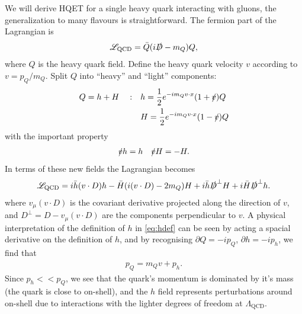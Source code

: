 We will derive HQET for a single heavy quark interacting with gluons, the generalization to many flavours is straightforward. The fermion part of the Lagrangian is
\begin{align}
  \mathscr{L}_{\text{QCD}} = \bar{Q} ( i\slashed{D} - m_Q ) Q,
  \label{eq:dirac}
\end{align}
where $Q$ is the heavy quark field. Define the heavy quark velocity $v$ according to $v = p_Q/m_Q$. Split $Q$ into ``heavy'' and ``light'' components:
\begin{align}
  \label{eq:hdef}
  Q = h + H\quad : \quad &h = {1\over 2} e^{-im_Q v\cdot x} ( 1 + \slashed{v} ) Q \\
  &H = {1\over 2} e^{-im_Q v\cdot x} ( 1 - \slashed{v} ) Q
\end{align}
with the important property
\begin{align}
  \slashed{v} h = h \quad \slashed{v} H = - H.
\end{align}
In terms of these new fields the Lagrangian becomes
\begin{align}
  \mathscr{L}_{\text{QCD}} = i\bar{h} (v\cdot D) h - \bar{H} ( i(v\cdot D) - 2m_Q ) H
  + i \bar{h} \slashed{D}^{\perp} H + i \bar{H} \slashed{D}^{\perp} h.
  \label{eq:HQET_preintegral}
\end{align}
where $v_{\mu}(v\cdot D)$ is the covariant derivative projected along the direction of $v$, and $D^{\perp} = D - v_{\mu}(v\cdot D)$ are the components perpendicular to $v$. %
A physical interpretation of the definition of $h$ in \eqref{eq:hdef} can be seen by acting a spacial derivative on the definition of $h$, and by recognising $\partial Q = -i p_Q$, $\partial h = -i p_h$, we find that
\begin{align}
  p_Q = m_Q v + p_h.
\end{align}
Since $p_h << p_Q$, we see that the quark's momentum is dominated by it's mass (the quark is close to on-shell), and the $h$ field represents perturbations around on-shell due to interactions with the lighter degrees of freedom at $\Lambda_{\text{QCD}}$.

